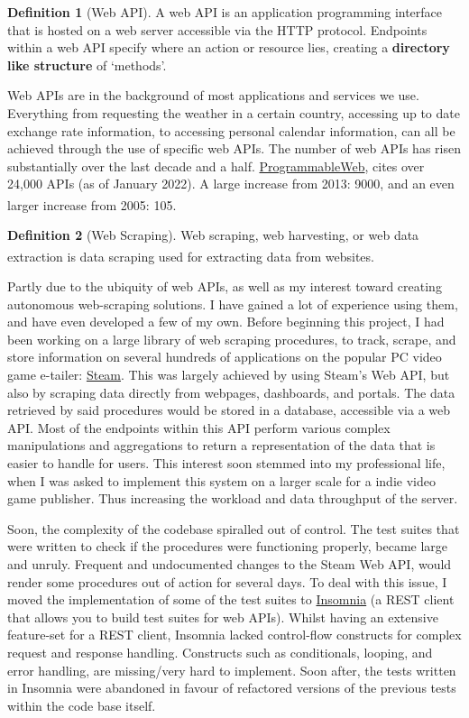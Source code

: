 \documentclass[]{full}
\theoremstyle{definition}
\newtheorem{definition}{Definition}[subsubsection]
\begin{document}
\begin{definition}[Web API]
    A web API is an application programming interface that is hosted on a web server accessible via the HTTP protocol. Endpoints within a web API specify where an action or resource lies, creating a \textbf{directory like structure} of `methods'.
\end{definition}

Web APIs are in the background of most applications and services we use. Everything from requesting the weather in a certain country, accessing up to date exchange rate information, to accessing personal calendar information, can all be achieved through the use of specific web APIs. The number of web APIs has risen substantially over the last decade and a half. \href{https://www.programmableweb.com/category/all/apis}{ProgrammableWeb}, cites over 24,000 APIs (as of January 2022). A large increase from 2013: 9000, and an even larger increase from 2005: 105\textsuperscript{\cite{duvander_2013}}.

\begin{definition}[Web Scraping]
    Web scraping, web harvesting, or web data extraction is data scraping used for extracting data from websites\textsuperscript{\cite{web_scraping_wikipedia_2022}}.
\end{definition}

Partly due to the ubiquity of web APIs, as well as my interest toward creating autonomous web-scraping solutions. I have gained a lot of experience using them, and have even developed a few of my own. Before beginning this project, I had been working on a large library of web scraping procedures, to track, scrape, and store information on several hundreds of applications on the popular PC video game e-tailer: \href{https://store.steampowered.com/}{Steam}. This was largely achieved by using Steam's Web API, but also by scraping data directly from webpages, dashboards, and portals. The data retrieved by said procedures would be stored in a database, accessible via a web API. Most of the endpoints within this API perform various complex manipulations and aggregations to return a representation of the data that is easier to handle for users. This interest soon stemmed into my professional life, when I was asked to implement this system on a larger scale for a indie video game publisher. Thus increasing the workload and data throughput of the server.

Soon, the complexity of the codebase spiralled out of control. The test suites that were written to check if the procedures were functioning properly, became large and unruly. Frequent and undocumented changes to the Steam Web API, would render some procedures out of action for several days. To deal with this issue, I moved the implementation of some of the test suites to \href{https://insomnia.rest/}{Insomnia} (a REST client that allows you to build test suites for web APIs). Whilst having an extensive feature-set for a REST client, Insomnia lacked control-flow constructs for complex request and response handling. Constructs such as conditionals, looping, and error handling, are missing/very hard to implement. Soon after, the tests written in Insomnia were abandoned in favour of refactored versions of the previous tests within the code base itself.
\end{document}
